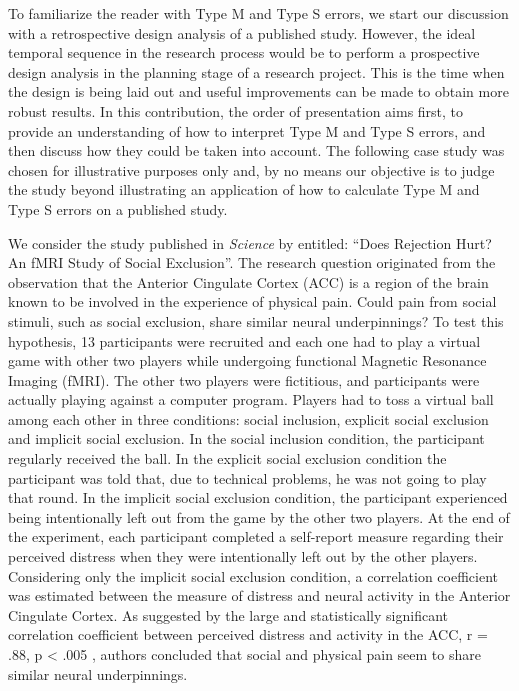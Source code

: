 \documentclass{article}\usepackage[]{graphicx}\usepackage[]{color}
\begin{document}
To familiarize the reader with Type M and Type S errors, we start our discussion with a retrospective design analysis of a published study. However, the ideal temporal sequence in the research process would be to perform a prospective design analysis in the planning stage of a research project. This is the time when the design is being laid out and useful improvements can be made to obtain more robust results. In this contribution, the order of presentation aims first, to provide an understanding of how to interpret Type M and Type S errors, and then discuss how they could be taken into account. The following case study was chosen for illustrative purposes only and, by no means our objective is to judge the study beyond illustrating an application of how to calculate Type M and Type S errors on a published study.

We consider the study published in \emph{Science} by \textcite{eisenbergerDoesRejectionHurt2003} entitled: “Does Rejection Hurt? An fMRI Study of Social Exclusion”. The research question originated from the observation that the Anterior Cingulate Cortex (ACC) is a region of the brain known to be involved in the experience of physical pain. Could pain from social stimuli, such as social exclusion, share similar neural underpinnings? To test this hypothesis, 13 participants were recruited and each one had to play a virtual game with other two players while undergoing functional Magnetic Resonance Imaging (fMRI). The other two players were fictitious, and participants were actually playing against a computer program. Players had to toss a virtual ball among each other in three conditions: social inclusion, explicit social exclusion and implicit social exclusion. In the social inclusion condition, the participant regularly received the ball. In the explicit social exclusion condition the participant was told that, due to technical problems, he was not going to play that round. In the implicit social exclusion condition, the participant experienced being intentionally left out from the game by the other two players. At the end of the experiment, each participant completed a self-report measure regarding their perceived distress when they were intentionally left out by the other players. Considering only the implicit social exclusion condition, a correlation coefficient was estimated between the measure of distress and neural activity in the Anterior Cingulate Cortex. As suggested by the large and statistically significant correlation coefficient between perceived distress and activity in the ACC, r = .88, p < .005 \parencite[p. 291]{eisenbergerDoesRejectionHurt2003}, authors concluded that social and physical pain seem to share similar neural underpinnings.
\end{document}

